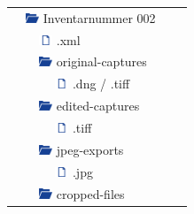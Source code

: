\begin{center}
\begin{tabular}{l l l l r p{}}
		& \multicolumn{3}{l}{\includegraphics[width=0.4cm]{bilder/OrdnerIconAuf.png} \hspace*{0.04cm} Inventarnummer 002} &  & \\
		& & \multicolumn{2}{l}{\includegraphics[width=0.4cm]{bilder/DateiIcon.png}\hspace*{0.04cm} .xml} &  & \\
		& & \multicolumn{2}{l}{\includegraphics[width=0.4cm]{bilder/OrdnerIconAuf.png} \hspace*{0.04cm} original-captures} &  & \\
		& & & \includegraphics[width=0.4cm]{bilder/DateiIcon.png} \hspace*{0.04cm} .dng / .tiff &  & \\
		& & \multicolumn{2}{l}{\includegraphics[width=0.4cm]{bilder/OrdnerIconAuf.png} \hspace*{0.04cm} edited-captures} &  & \\
		& & & \includegraphics[width=0.4cm]{bilder/DateiIcon.png} \hspace*{0.04cm} .tiff &  & \\
		& & \multicolumn{2}{l}{\includegraphics[width=0.4cm]{bilder/OrdnerIconAuf.png} \hspace*{0.04cm} jpeg-exports} &  & \\
		& & & \includegraphics[width=0.4cm]{bilder/DateiIcon.png} \hspace*{0.04cm} .jpg &  & \\
		& & \multicolumn{2}{l}{\includegraphics[width=0.4cm]{bilder/OrdnerIconAuf.png} \hspace*{0.04cm} cropped-files} &  & \\

\end{tabular}
\end{center}

